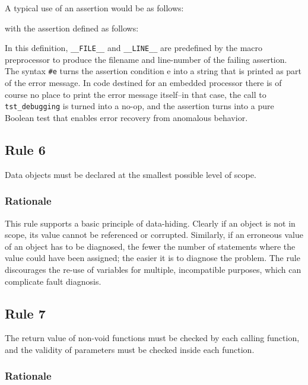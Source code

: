 \documentclass[11pt,oneside]{article}
\begin{document}
A typical use of an assertion would be as follows:



with the assertion defined as follows:



In this definition, \texttt{\_\_FILE\_\_} and \texttt{\_\_LINE\_\_} are
predefined by the macro preprocessor to produce the filename and line-number of
the failing assertion. The syntax \texttt{\#e} turns the assertion condition e
into a string that is printed as part of the error message. In code destined
for an embedded processor there is of course no place to print the error
message itself--in that case, the call to \texttt{tst\_debugging} is turned
into a no-op, and the assertion turns into a pure Boolean test that enables
error recovery from anomalous behavior.

\subsection{Rule 6}

Data objects must be declared at the smallest possible level of scope.

\subsubsection*{Rationale}

This rule supports a basic principle of data-hiding. Clearly if an object is
not in scope, its value cannot be referenced or corrupted.  Similarly, if an
erroneous value of an object has to be diagnosed, the fewer the number of
statements where the value could have been assigned; the easier it is to
diagnose the problem. The rule discourages the re-use of variables for
multiple, incompatible purposes, which can complicate fault diagnosis.

\subsection{Rule 7}

The return value of non-void functions must be checked by each calling
function, and the validity of parameters must be checked inside each function.

\subsubsection*{Rationale}
\end{document}

